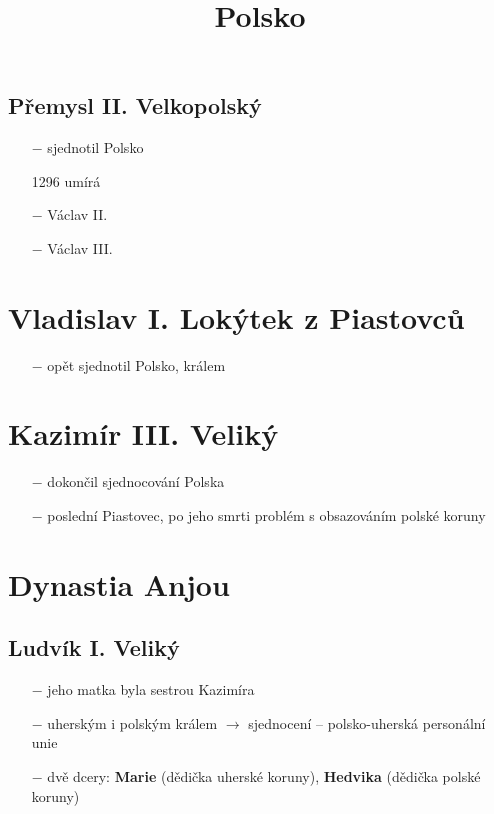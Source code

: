 \documentclass{article}
\title{\vspace{-2cm}Polsko\vspace{-1.7cm}}
\date{}
\author{}
\begin{document}
\maketitle

\subsection*{Přemysl II. Velkopolský}
\begin{itemize}
    \vspace{-0.5em}
    \setlength\itemsep{0.15em}
    \item[$-$] sjednotil Polsko
    \item[1296] umírá
\end{itemize}

\begin{itemize}
    \vspace{-0.5em}
    \setlength\itemsep{0.15em}
    \item[$-$] Václav II.
    \item[$-$] Václav III.
\end{itemize}

\section*{Vladislav I. Lokýtek z Piastovců}
\begin{itemize}
    \vspace{-0.5em}
    \setlength\itemsep{0.15em}
    \item[$-$] opět sjednotil Polsko, králem
\end{itemize}

\section*{Kazimír III. Veliký}
\begin{itemize}
    \vspace{-0.5em}
    \setlength\itemsep{0.15em}
    \item[$-$] dokončil sjednocování Polska
    \item[$-$] poslední Piastovec, po jeho smrti problém s obsazováním polské koruny
\end{itemize}

\section*{Dynastia Anjou}
\subsection*{Ludvík I. Veliký}
\begin{itemize}
    \vspace{-0.5em}
    \setlength\itemsep{0.15em}
    \item[$-$] jeho matka byla sestrou Kazimíra
    \item[$-$] uherským i polským králem $\rightarrow$ sjednocení -- polsko-uherská personální unie
    \item[$-$] dvě dcery: \textbf{Marie} (dědička uherské koruny), \textbf{Hedvika} (dědička polské koruny)
\end{itemize}
\end{document}
